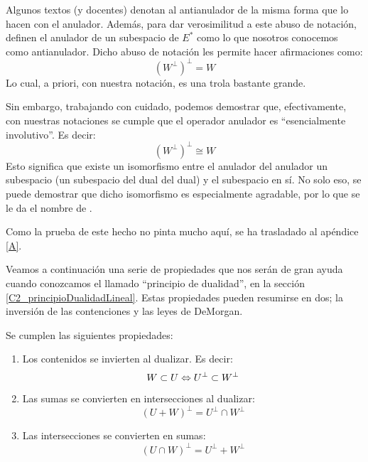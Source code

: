 \begin{obs}
	Algunos textos (y docentes) denotan al antianulador de la misma forma que lo hacen con el anulador. Además, para dar verosimilitud a este abuso de notación, definen el anulador de un subespacio de $E^*$ como lo que nosotros conocemos como antianulador. Dicho abuso de notación les permite hacer afirmaciones como:
	\[(W^\perp)^\perp=W\]
	Lo cual, a priori, con nuestra notación, es una trola bastante grande.
	
	Sin embargo, trabajando con cuidado, podemos demostrar que, efectivamente, con nuestras notaciones se cumple que el operador anulador es ``esencialmente involutivo''. Es decir:
	\begin{equation}
		(W^\perp)^\perp\cong W
	\end{equation}
	Esto significa que existe un isomorfismo entre el anulador del anulador un subespacio (un subespacio del dual del dual) y el subespacio en sí. No solo eso, se puede demostrar que dicho isomorfismo es especialmente agradable, por lo que se le da el nombre de .
	
	Como la prueba de este hecho no pinta mucho aquí, se ha trasladado al apéndice \ref{A}.
\end{obs}
Veamos a continuación una serie de propiedades que nos serán de gran ayuda cuando conozcamos el llamado ``principio de dualidad'', en la sección \ref{C2_principioDualidadLineal}. Estas propiedades pueden resumirse en dos; la inversión de las contenciones y las leyes de DeMorgan.
\begin{prop}
	\label{C2_pro_propiedades_dualidad}
	Se cumplen las siguientes propiedades:
	\begin{enumerate}
		\item Los contenidos se invierten al dualizar. Es decir: \[W\subset U\Leftrightarrow U^{\perp}\subset W^{\perp}\]
		\item Las sumas se convierten en intersecciones al dualizar:
		\[(U+W)^{\perp}=U^{\perp}\cap W^{\perp}\]
		\item Las intersecciones se convierten en sumas:
		\[(U\cap W)^{\perp}=U^{\perp}+ W^{\perp}\]
	\end{enumerate}
\end{prop}
